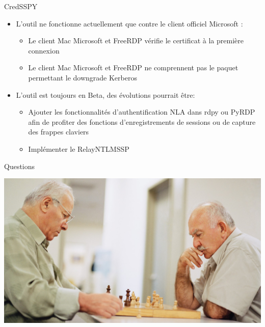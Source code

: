 \documentclass{beamer}
\begin{document}
\begin{frame}[fragile]{CredSSPY }
\begin{itemize}
\item L'outil ne fonctionne actuellement que contre le client officiel Microsoft :
	\begin{itemize}
	\item Le client Mac Microsoft et FreeRDP vérifie le certificat à la première connexion
	\item Le client Mac Microsoft et FreeRDP ne comprennent pas le paquet permettant le downgrade Kerberos
	\end{itemize}
\item L'outil est toujours en Beta, des évolutions pourrait être:
	\begin{itemize}
	\item Ajouter les fonctionnalités d'authentification NLA dans rdpy ou PyRDP afin de profiter des fonctions d'enregistrements de sessions ou de capture des frappes claviers
	\item Implémenter le RelayNTLMSSP
	\end{itemize}
\end{itemize}
\end{frame}


\begin{frame}[fragile]{Questions}
	 \begin{center}	 \includegraphics[scale=0.26]{vieux.png}
	 \end{center}

\end{frame}
\end{document}
